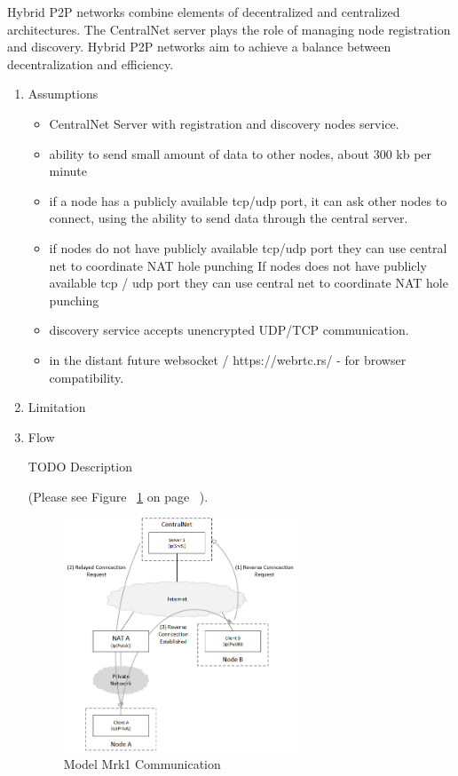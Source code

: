 \begin{enumerate}
Hybrid P2P networks combine elements of decentralized and centralized architectures.
The CentralNet server plays the role of managing node registration and discovery.
Hybrid P2P networks aim to achieve a balance between decentralization and efficiency.

\begin{enumerate}

\item Assumptions

\begin{itemize}

\item CentralNet Server with registration and discovery nodes service.

\item ability to send small amount of data to other nodes, about 300 kb per minute

\item if a node has a publicly available tcp/udp port, it can ask other nodes to connect,
using the ability to send data through the central server.

\item if nodes do not have publicly available tcp/udp port they can use central net to coordinate NAT hole punching
If nodes does not have publicly available tcp / udp port they can use central net to coordinate NAT hole punching

\item discovery service accepts unencrypted UDP/TCP communication.

\item in the distant future websocket / https://webrtc.rs/ - for browser compatibility.

\end{itemize} 

\item Limitation 

\item Flow

TODO Description

(Please see Figure ~\ref{fig:MM1C} on page ~\pageref{fig:MM1C}).

\begin{figure}[htbp]
    \centering
    \includegraphics[width=7cm,angle=0]{./diag/Issue/NATReversal-Mk1-Issue.png}
	\caption{Model Mrk1 Communication}
    \label{fig:MM1C}
\end{figure}


\end{enumerate}
\end{enumerate}
